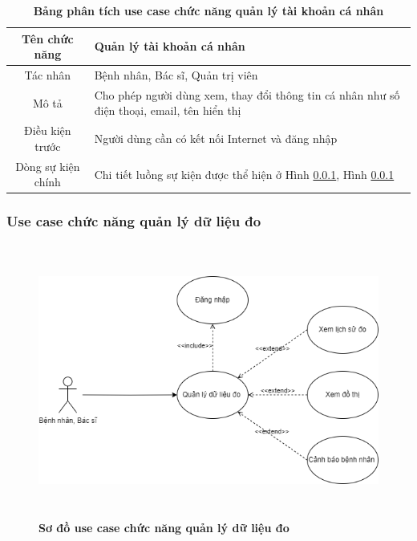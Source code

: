   \begin{table}[H]
    \caption{\bfseries \fontsize{12pt}{0pt}\selectfont Bảng phân tích use case chức năng quản lý tài khoản cá nhân}
    \centering
    \begin{tabularx}{0.9\textwidth}{|c|X|}
      \hline
      \textbf{Tên chức năng} & \textbf{Quản lý tài khoản cá nhân} \\
      \hline
      Tác nhân & Bệnh nhân, Bác sĩ, Quản trị viên \\
      \hline
      Mô tả & Cho phép người dùng xem, thay đổi thông tin cá nhân như số điện thoại, email, tên hiển thị
       \\
      \hline
      Điều kiện trước & Người dùng cần có kết nối Internet và đăng nhập \\
      \hline
      Dòng sự kiện chính & 
        Chi tiết luồng sự kiện được thể hiện ở Hình \ref{}, Hình \ref{} 
        \\
      \hline
    \end{tabularx}
  \end{table}

\subsubsection{Use case chức năng quản lý dữ liệu đo}
  \begin{figure}[H]
    \centering
    \includegraphics[width=15.2cm,height=9cm]{Images/use_case/use_case_view_history_record.png}
    \caption[Sơ đồ use case chức năng quản lý dữ liệu đo]{\bfseries \fontsize{12pt}{0pt}
    \selectfont Sơ đồ use case chức năng quản lý dữ liệu đo}
    \label{use_case_view_history_record} %
  \end{figure}

